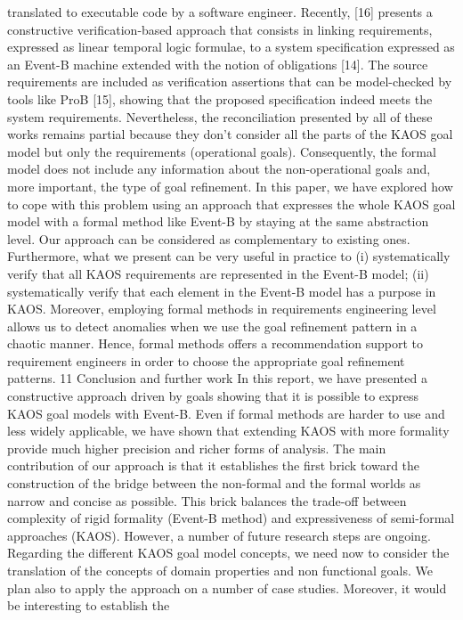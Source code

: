 translated to executable code by a software engineer.
Recently, [16] presents a constructive verification-based approach that consists in linking
requirements, expressed as linear temporal logic formulae, to a system specification expressed
as an Event-B machine extended with the notion of obligations [14]. The source requirements
are included as verification assertions that can be model-checked by tools like ProB [15],
showing that the proposed specification indeed meets the system requirements.
Nevertheless, the reconciliation presented by all of these works remains partial because
they don’t consider all the parts of the KAOS goal model but only the requirements (operational goals). Consequently, the formal model does not include any information about the
non-operational goals and, more important, the type of goal refinement. In this paper, we
have explored how to cope with this problem using an approach that expresses the whole
KAOS goal model with a formal method like Event-B by staying at the same abstraction
level. Our approach can be considered as complementary to existing ones. Furthermore,
what we present can be very useful in practice to (i) systematically verify that all KAOS
requirements are represented in the Event-B model; (ii) systematically verify that each element in the Event-B model has a purpose in KAOS. Moreover, employing formal methods in
requirements engineering level allows us to detect anomalies when we use the goal refinement
pattern in a chaotic manner. Hence, formal methods offers a recommendation support to
requirement engineers in order to choose the appropriate goal refinement patterns.
11 Conclusion and further work
In this report, we have presented a constructive approach driven by goals showing that it
is possible to express KAOS goal models with Event-B. Even if formal methods are harder
to use and less widely applicable, we have shown that extending KAOS with more formality
provide much higher precision and richer forms of analysis. The main contribution of our
approach is that it establishes the first brick toward the construction of the bridge between
the non-formal and the formal worlds as narrow and concise as possible. This brick balances
the trade-off between complexity of rigid formality (Event-B method) and expressiveness of
semi-formal approaches (KAOS). However, a number of future research steps are ongoing.
Regarding the different KAOS goal model concepts, we need now to consider the translation
of the concepts of domain properties and non functional goals. We plan also to apply the
approach on a number of case studies. Moreover, it would be interesting to establish the
